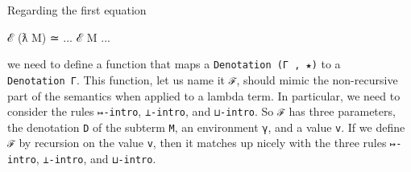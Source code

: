 Regarding the first equation

\begin{myDisplay}
ℰ (ƛ M) ≃ ... ℰ M ...
\end{myDisplay}

we need to define a function that maps a \texttt{Denotation\ (Γ\ ,\ ★)}
to a \texttt{Denotation\ Γ}. This function, let us name it \texttt{ℱ},
should mimic the non-recursive part of the semantics when applied to a
lambda term. In particular, we need to consider the rules
\texttt{↦-intro}, \texttt{⊥-intro}, and \texttt{⊔-intro}. So \texttt{ℱ}
has three parameters, the denotation \texttt{D} of the subterm
\texttt{M}, an environment \texttt{γ}, and a value \texttt{v}. If we
define \texttt{ℱ} by recursion on the value \texttt{v}, then it matches
up nicely with the three rules \texttt{↦-intro}, \texttt{⊥-intro}, and
\texttt{⊔-intro}.

\begin{fence}
\begin{code}%
\>[0]\AgdaSpace{}%
\AgdaSymbol{:}\AgdaSpace{}%
\AgdaSymbol{\}}\AgdaSpace{}%
\AgdaSpace{}%
\AgdaSpace{}%
\AgdaSymbol{(}\AgdaSpace{}%
\AgdaOperator{\AgdaInductiveConstructor{,}}\AgdaSpace{}%
\AgdaSymbol{)}\AgdaSpace{}%
\AgdaSpace{}%
\AgdaSpace{}%
\<%
\\
\>[0]\AgdaSpace{}%
\AgdaSpace{}%
\AgdaSpace{}%
\AgdaSymbol{(}\AgdaSpace{}%
\AgdaSpace{}%
\AgdaSymbol{)}\AgdaSpace{}%
\AgdaSymbol{=}\AgdaSpace{}%
\AgdaSpace{}%
\AgdaSymbol{(}\AgdaSpace{}%
\AgdaSpace{}%
\AgdaSymbol{)}\AgdaSpace{}%
\<%
\\
\>[0]\AgdaSpace{}%
\AgdaSpace{}%
\AgdaSpace{}%
\AgdaSpace{}%
\AgdaSymbol{=}\AgdaSpace{}%
\<%
\\
\>[0]\AgdaSpace{}%
\AgdaSpace{}%
\AgdaSpace{}%
\AgdaSymbol{(}\AgdaSpace{}%
\AgdaSpace{}%
\AgdaSymbol{)}\AgdaSpace{}%
\AgdaSymbol{=}\AgdaSpace{}%
\AgdaSymbol{(}\AgdaSpace{}%
\AgdaSpace{}%
\AgdaSpace{}%
\AgdaSymbol{)}\AgdaSpace{}%
\AgdaSpace{}%
\AgdaSymbol{(}\AgdaSpace{}%
\AgdaSpace{}%
\AgdaSpace{}%
\AgdaSymbol{)}\<%
\end{code}
\end{fence}

